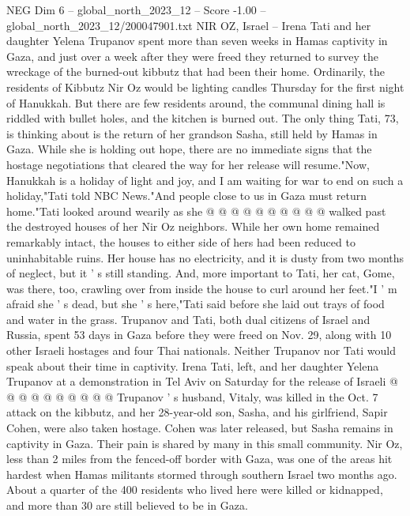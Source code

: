 \begin{textsample}{NEG Dim 6 – global\_north\_2023\_12 – Score -1.00 – global\_north\_2023\_12/200047901.txt}  \label{ex:f6_neg_322}
NIR OZ, Israel -- Irena Tati and her daughter Yelena Trupanov spent more than seven weeks in Hamas captivity in Gaza, and just over a week after they were freed they returned to survey the wreckage of the burned-out kibbutz that had been their home.
Ordinarily, the residents of Kibbutz Nir Oz would be lighting candles Thursday for the first night of Hanukkah.
But there are few residents around, the communal dining hall is riddled with bullet holes, and the kitchen is burned out.
The only thing Tati, 73, is thinking about is the return of her grandson Sasha, still held by Hamas in Gaza.
While she is holding out hope, there are no immediate signs that the hostage negotiations that cleared the way for her release will resume."Now, Hanukkah is a holiday of light and joy, and I am waiting for war to end on such a holiday,"Tati told NBC News."And people close to us in Gaza must return home."Tati looked around wearily as she @ @ @ @ @ @ @ @ @ @ walked past the destroyed houses of her Nir Oz neighbors.
While her own home remained remarkably intact, the houses to either side of hers had been reduced to uninhabitable ruins.
Her house has no electricity, and it is dusty from two months of neglect, but it ' s still standing.
And, more important to Tati, her cat, Gome, was there, too, crawling over from inside the house to curl around her feet."I ' m afraid she ' s dead, but she ' s here,"Tati said before she laid out trays of food and water in the grass.
Trupanov and Tati, both dual citizens of Israel and Russia, spent 53 days in Gaza before they were freed on Nov. 29, along with 10 other Israeli hostages and four Thai nationals.
Neither Trupanov nor Tati would speak about their time in captivity.
Irena Tati, left, and her daughter Yelena Trupanov at a demonstration in Tel Aviv on Saturday for the release of Israeli @ @ @ @ @ @ @ @ @ @ Trupanov ' s husband, Vitaly, was killed in the Oct. 7 attack on the kibbutz, and her 28-year-old son, Sasha, and his girlfriend, Sapir Cohen, were also taken hostage.
Cohen was later released, but Sasha remains in captivity in Gaza.
Their pain is shared by many in this small community.
Nir Oz, less than 2 miles from the fenced-off border with Gaza, was one of the areas hit hardest when Hamas militants stormed through southern Israel two months ago.
About a quarter of the 400 residents who lived here were killed or kidnapped, and more than 30 are still believed to be in Gaza.

\end{textsample}
